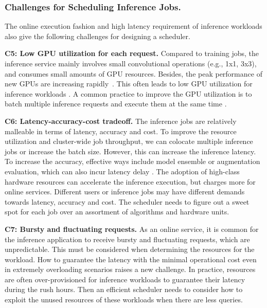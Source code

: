 \subsubsection{Challenges for Scheduling Inference Jobs.}
\label{sec_inference_challenge}The online execution fashion and high latency requirement of inference workloads also give the following challenges for designing a scheduler.


\textbf{C5: Low GPU utilization for each request.}
Compared to training jobs, the inference service mainly involves small convolutional operations (e.g., 1x1, 3x3), and consumes small amounts of GPU resources. Besides, the peak performance of new GPUs are increasing rapidly~\cite{IOS}. This often leads to low GPU utilization for inference workloads \cite{lemay2020Perseus,zhang2020mark}. A common practice to improve the GPU utilization is to batch multiple inference requests and execute them at the same time \cite{Daniel2017clipper}.



\textbf{C6: Latency-accuracy-cost tradeoff.}
The inference jobs are relatively malleable in terms of latency, accuracy and cost. To improve the resource utilization and cluster-wide job throughput, we can colocate multiple inference jobs or increase the batch size. However, this can increase the inference latency. To increase the accuracy, effective ways include model ensemble or augmentation evaluation, which can also incur latency delay \cite{Jashwant2021Cocktail}.
The adoption of high-class hardware resources can accelerate the inference execution, but charges more for online services. Different users or inference jobs may have different demands towards latency, accuracy and cost. The scheduler needs to figure out a sweet spot for each job over an assortment of algorithms and hardware units.



\textbf{C7: Bursty and fluctuating requests.}
As an online service, it is common for the inference application to receive bursty and fluctuating requests, which are unpredictable. This must be considered when determining the resources for the workload. How to guarantee the latency with the minimal operational cost even in extremely overloading scenarios raises a new challenge. In practice, resources are often over-provisioned for inference workloads to guarantee their latency during the rush hours. Then an efficient scheduler needs to consider how to exploit the unused resources of these workloads when there are less queries.












